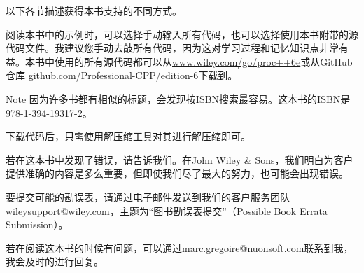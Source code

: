 以下各节描述获得本书支持的不同方式。


阅读本书中的示例时，可以选择手动输入所有代码，也可以选择使用本书附带的源代码文件。我建议您手动去敲所有代码，因为这对学习过程和记忆知识点非常有益。本书中使用的所有源代码都可以从\href{www.wiley.com/go/proc++6e}{www.wiley.com/go/proc++6e}或从GitHub仓库 \href{github.com/Professional-CPP/edition-6}{github.com/Professional-CPP/edition-6}下载到。

\begin{myNotic}{Note}
因为许多书都有相似的标题，会发现按ISBN搜索最容易。这本书的ISBN是978-1-394-19317-2。
\end{myNotic}

下载代码后，只需使用解压缩工具对其进行解压缩即可。


若在这本书中发现了错误，请告诉我们。在John Wiley \& Sons，我们明白为客户提供准确的内容是多么重要，但即使我们尽了最大的努力，也可能会出现错误。

要提交可能的勘误表，请通过电子邮件发送到我们的客户服务团队\href{wileysupport@wiley.com}{wileysupport@wiley.com}，主题为“图书勘误表提交”（Possible Book Errata Submission）。


若在阅读这本书的时候有问题，可以通过\href{marc.gregoire@nuonsoft.com}{marc.gregoire@nuonsoft.com}联系到我，我会及时的进行回复。